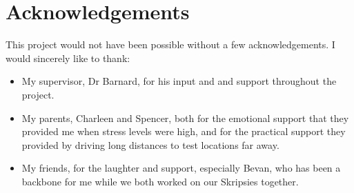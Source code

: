\chapter*{Acknowledgements}
\makeatletter{}\makeatother

This project would not have been possible without a few acknowledgements. I would sincerely like to thank:
\begin{itemize}
    \item My supervisor, Dr Barnard, for his input and and support throughout the project.
    \item My parents, Charleen and Spencer, both for the emotional support that they provided me when stress levels were high, and for the practical support they provided by driving long distances to test locations far away.
    \item My friends, for the laughter and support, especially Bevan, who has been a backbone for me while we both worked on our Skripsies together.
\end{itemize}
